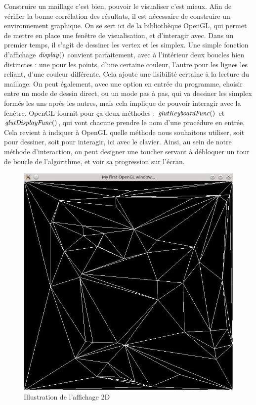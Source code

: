 \documentclass[10pt,a4paper]{report}
\begin{document}
\hspace*{10mm}Construire un maillage c'est bien, pouvoir le visualiser c'est mieux.
Afin de vérifier la bonne corrélation des résultats, il est nécessaire de construire un environnement graphique. On se sert ici de la bibliothèque OpenGL, qui permet de mettre en place une fenêtre de visualisation, et d'interagir avec.  \newline \newline
Dans un premier temps, il s'agit de dessiner les vertex et les simplex. Une simple fonction d'affichage $\it{display()}$ convient parfaitement, avec à l'intérieur deux boucles bien distinctes : une pour les points, d'une certaine couleur, l'autre pour les lignes les reliant, d'une couleur différente. Cela ajoute une lisibilité certaine à la lecture du maillage. On peut également, avec une option en entrée du programme, choisir entre un mode de dessin direct, ou un mode pas à pas, qui va dessiner les simplex formés les uns après les autres, mais cela implique de pouvoir interagir avec la fenêtre. \newline 
OpenGL fournit pour ça deux méthodes : $\it{glutKeyboardFunc()}$ et $\it{glutDisplayFunc()}$, qui vont chacune prendre le nom d'une procédure en entrée. Cela revient à indiquer à OpenGL quelle méthode nous souhaitons utiliser, soit pour dessiner, soit pour interagir, ici avec le clavier. Ainsi, au sein de notre méthode d'interaction, on peut designer une toucher servant à débloquer un tour de boucle de l'algorithme, et voir sa progression sur l'écran.

\begin{figure}[h]
	\begin{center}
  		\includegraphics[scale=0.5]{2D.png} 
  	\end{center}
   	\caption{Illustration de l'affichage 2D}
	\label{Illustration de l'affichage 2D}
\end{figure}
\end{document}
